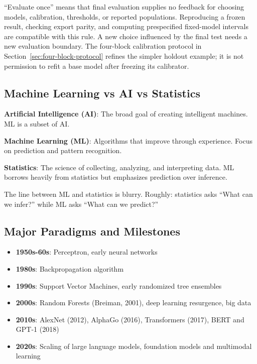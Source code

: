 \documentclass[11pt,twoside]{article}
\numberwithin{equation}{section}
\theoremstyle{plain}
\theoremstyle{definition}
\theoremstyle{remark}
\newenvironment{keyidea}{
  \begin{tcolorbox}[colback=yellow!5!white,
                    colframe=yellow!50!black,
                    title=Key Idea,
                    breakable,
                    enhanced,
                    sharp corners,
                    boxrule=0.8pt,
                    left=6pt, right=6pt, top=6pt, bottom=6pt]
}{
  \end{tcolorbox}
}
\begin{document}
``Evaluate once'' means that final evaluation supplies no feedback for choosing
models, calibration, thresholds, or reported populations. Reproducing a frozen
result, checking export parity, and computing prespecified fixed-model intervals
are compatible with this rule. A new choice influenced by the final test needs
a new evaluation boundary. The four-block calibration protocol in
Section~\ref{sec:four-block-protocol} refines the simpler holdout example;
it is not permission to refit a base model after freezing its calibrator.

\subsection{Machine Learning vs AI vs Statistics}

\begin{keyidea}
\textbf{Artificial Intelligence (AI)}: The broad goal of creating intelligent machines. ML is a subset of AI.

\textbf{Machine Learning (ML)}: Algorithms that improve through experience. Focus on prediction and pattern recognition.

\textbf{Statistics}: The science of collecting, analyzing, and interpreting data. ML borrows heavily from statistics but emphasizes prediction over inference.

The line between ML and statistics is blurry. Roughly: statistics asks ``What can we infer?'' while ML asks ``What can we predict?''
\end{keyidea}

\subsection{Major Paradigms and Milestones}

\begin{itemize}
\item \textbf{1950s-60s}: Perceptron, early neural networks
\item \textbf{1980s}: Backpropagation algorithm
\item \textbf{1990s}: Support Vector Machines, early randomized tree ensembles
\item \textbf{2000s}: Random Forests (Breiman, 2001), deep learning resurgence, big data
\item \textbf{2010s}: AlexNet (2012), AlphaGo (2016), Transformers (2017), BERT and GPT-1 (2018)
\item \textbf{2020s}: Scaling of large language models, foundation models and multimodal learning
\end{itemize}
\end{document}
